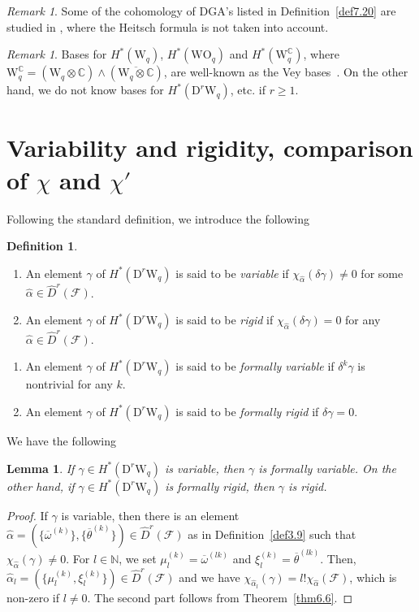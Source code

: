 \documentclass[12pt]{amsart}
\newcommand{\CF}{{\mathcal F}}
\newcommand{\C}{{\mathbb C}}
\newcommand{\N}{{\mathbb N}}
\newcommand{\WO}{\mathrm{WO}}
\newcommand{\W}{\mathrm{W}}
\newcommand{\D}{\mathrm{D}}
\newtheorem{lemma}[theorem]{Lemma}
\theoremstyle{definition}
\newtheorem{definition}[theorem]{Definition}
\theoremstyle{remark}
\newtheorem{remark}[theorem]{Remark}
\begin{document}
\begin{remark}
Some of the cohomology of DGA's listed in Definition~\ref{def7.20} are studied in \cite{asuke:UT}, where the Heitsch formula is not taken into account.
\end{remark}

\begin{remark}
Bases for $H^*(\W_q)$, $H^*(\WO_q)$ and $H^*(\W^\C_q)$, where $\W^\C_q=(\W_q\otimes\C)\wedge(\overline{\W_q\otimes\C})$, are well-known as the Vey bases~\cite{Godbillon}.
On the other hand, we do not know bases for $H^*(\D^r\W_q)$, etc. if $r\geq1$.
\end{remark}

\section{Variability and rigidity, comparison of $\chi$ and $\chi'$}

Following the standard definition, we introduce the following
\begin{definition}
\begin{enumerate}
\item
An element $\gamma$ of $H^*(\D^r\W_q)$ is said to be \textit{variable} if $\chi_{\widehat{\alpha}}(\delta\gamma)\neq0$ for some $\widehat\alpha\in\widehat{D}^r(\CF)$.
\item
An element $\gamma$ of $H^*(\D^r\W_q)$ is said to be \textit{rigid} if $\chi_{\widehat\alpha}(\delta\gamma)=0$ for any \mbox{$\widehat\alpha\in\widehat{D}^r(\CF)$}.
\end{enumerate}
\begin{enumerate}
\item[1')]
An element $\gamma$ of $H^*(\D^r\W_q)$ is said to be \textit{formally variable} if $\delta^k\gamma$ is nontrivial for any $k$.
\item[2')]
An element $\gamma$ of $H^*(\D^r\W_q)$ is said to be \textit{formally rigid} if $\delta\gamma=0$.
\end{enumerate}
\end{definition}

We have the following
\begin{lemma}
\label{lem7.22}
If $\gamma\in H^*(\D^r\W_q)$ is variable, then $\gamma$ is formally variable.
On the other hand, if $\gamma\in H^*(\D^r\W_q)$ is formally rigid, then $\gamma$ is rigid.
\end{lemma}
\begin{proof}
If $\gamma$ is variable, then there is an element $\widehat\alpha=(\{\overline\omega^{(k)}\},\{\overline\theta^{(k)}\})\in\widehat{D}^r(\CF)$ as in Definition~\ref{def3.9} such that $\chi_{\widehat\alpha}(\gamma)\neq0$.
For $l\in\N$, we set $\mu_l^{(k)}=\overline\omega^{(lk)}$ and $\xi_l^{(k)}=\overline\theta^{(lk)}$.
Then, $\widehat\alpha_l=(\{\mu_l^{(k)},\xi_l^{(k)}\})\in\widehat{D}^r(\CF)$ and we have $\chi_{\widehat\alpha_l}(\gamma)=l!\chi_{\widehat\alpha}(\CF)$, which is non-zero if $l\neq0$.
The second part follows from Theorem~\ref{thm6.6}.
\end{proof}
\end{document}
